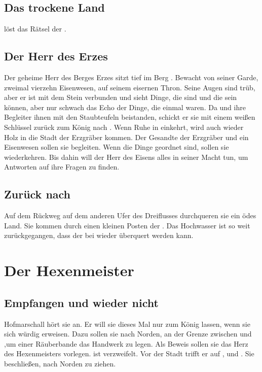 \documentclass[12pt,a4paper,onecolumn,oneside,ngerman]{book}
\begin{document}
\chapter{Das trockene Land}
{\Molitor}löst das Rätsel der {\Staubteufel}.

\chapter{Der Herr des Erzes}
Der geheime Herr des Berges Erzes sitzt tief im Berg {\Abaton}. Bewacht von seiner Garde, zweimal vierzehn Eisenwesen, auf seinem eisernen Thron. Seine Augen sind trüb, aber er ist mit dem Stein verbunden und sieht Dinge, die sind und die sein können, aber nur schwach das Echo der Dinge, die einmal waren.\linebreak
Da {\Sena} und ihre Begleiter ihnen mit den Staubteufeln beistanden, schickt er sie mit einem weißen Schlüssel zurück zum König nach {\Rhingell}. Wenn Ruhe in {\Rhingell} einkehrt, wird auch wieder Holz in die Stadt der Erzgräber kommen. Der Gesandte \Safir der Erzgräber und ein Eisenwesen sollen sie begleiten.\linebreak
Wenn die Dinge geordnet sind, sollen sie wiederkehren. Bis dahin will der Herr des Eisens alles in seiner Macht tun, um Antworten auf ihre Fragen zu finden.

\chapter{Zurück nach {\Rhingell}}
Auf dem Rückweg auf dem anderen Ufer des Dreiflusses durchqueren sie ein ödes Land. Sie kommen durch einen kleinen Posten der {\Eisenmeister}.\linebreak 
Das Hochwasser ist so weit zurückgegangen, dass der {\Dreifluss} bei {\Toris} wieder überquert werden kann.

\part{Der Hexenmeister}
\chapter{Empfangen und wieder nicht}
Hofmarschall {\Isodoriin} hört sie an. Er will sie dieses Mal nur zum König lassen, wenn sie sich würdig erweisen. Dazu sollen sie nach Norden, an der Grenze zwischen {\Nordmark} und {\Bergmark},um einer Räuberbande das Handwerk zu legen. Als Beweis sollen sie das Herz des Hexenmeisters vorlegen.\linebreak
{\Arn} ist verzweifelt. Vor der Stadt trifft er auf {\Tremor}, {\Umbra} und {\Enna}. Sie beschließen, nach Norden zu ziehen.
\end{document}
